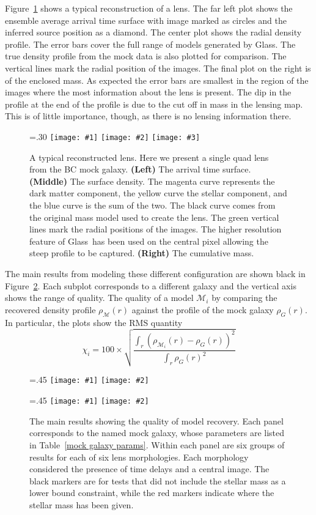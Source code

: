\documentclass[galley]{mn2e}
\newcommand{\Glass}{{\sc Glass}}
\newcommand{\M}{\ensuremath{\mathscr{M}}}
\newcommand{\tabref}[1] {Table~\ref{#1}}
\newcommand{\figref}[1] {Figure~\ref{#1}}
\newcommand\plottwo[2]{{%
 \centering
 \leavevmode
 \columnwidth=.45\columnwidth
 \texttt{[image: \#1]}%
 \hfil
 \texttt{[image: \#2]}%
}}%
\newcommand\plotthree[3]{{%
 \centering
 \leavevmode
 \columnwidth=.30\columnwidth
 \texttt{[image: \#1]}%
 \hfil
 \texttt{[image: \#2]}%
 \hfil
 \texttt{[image: \#3]}%
}}%
\begin{document}
\figref{reconstruction} shows a typical reconstruction of a
lens. The far left plot shows the ensemble average arrival time surface with
image marked as circles and the inferred source position as a diamond. The
center plot shows the radial density profile. The error bars cover the full
range of models generated by \Glass. The true density profile from the mock
data is also plotted for comparison. The vertical lines mark the radial
position of the images. The final plot on the right is of the enclosed mass. As
expected the error bars are smallest in the region of the images where the most
information about the lens is present. The dip in the profile at the end of the
profile is due to the cut off in mass in the lensing map. This is of little
importance, though, as there is no lensing information there.

\begin{figure}
\plotthree{BCQuadR1a_TmS-a.pdf}{BCQuadR1a_TmS-b.pdf}{BCQuadR1a_TmS-c.pdf}
\caption{A typical reconstructed lens. Here we present a single quad lens from 
the BC mock galaxy.
\textbf{(Left)}
The arrival time surface. 
\textbf{(Middle)}
The surface density. The magenta curve represents the dark matter component,
the yellow curve the stellar component, and the blue curve is the sum of the two.
The black curve comes from the original mass model used to create the lens.
The green vertical lines mark the radial positions of the images. The higher
resolution feature of \Glass\ has been used on the central pixel allowing the
steep profile to be captured.
\textbf{(Right)}
The cumulative mass.}
\label{reconstruction}
\end{figure}

The main results from modeling these different configuration are shown black in
\figref{main results}. Each subplot corresponds to a different galaxy and
the vertical axis shows the range of quality.  The quality of a
model $\M_i$ by comparing the recovered density profile $\rho_\M(r)$ against
the profile of the mock galaxy $\rho_G(r)$.  In particular, the plots show the
RMS quantity
%
\begin{equation}
  \chi_i = 100 \times \sqrt{\frac{\int_r (\rho_{\M_i}(r) - \rho_G(r))^2}{\int_r \rho_G(r)^2}}
\end{equation}
%

\begin{figure}
\plottwo{AAchi2_profile.pdf}{BBchi2_profile.pdf}

\plottwo{ACchi2_profile.pdf}{BCchi2_profile.pdf}
\caption{The main results showing the quality of model recovery. Each panel corresponds to 
the named mock galaxy, whose parameters are listed in \tabref{mock galaxy params}. Within
each panel are six groups of results for each of six lens morphologies. Each morphology
considered the presence of time delays and a central image. The black markers are for tests
that did not include the stellar mass as a lower bound constraint, while the red markers
indicate where the stellar mass has been given.}
\label{main results}
\end{figure}
\end{document}
